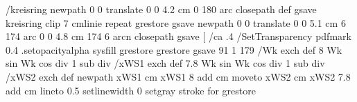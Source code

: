 {{%
/kreisring { newpath
                      0 0 translate
                      0 0 4.2 cm 0 180 arc
                     closepath
                    } def
               gsave
                        kreisring clip
                        7 {cmlinie} repeat
              grestore
   gsave
                 newpath
                      0 0 translate
                      0 0 5.1 cm 6 174 arc
                      0 0 4.8 cm 174 6 arcn
                 closepath
                   gsave
                    \pst@usecolor\ProLineCol
                      [ /ca .4 /SetTransparency  pdfmark %
                       0.4 .setopacityalpha
                       sysfill
                 grestore
   grestore
 gsave
   91 1 179 { /Wk exch def %
                       {8 Wk sin Wk cos div 1 sub div} /xWS1 exch def %
                       {7.8 Wk sin Wk cos div 1 sub div} /xWS2 exch def %
                        newpath
                        xWS1 cm xWS1 8 add cm moveto %
                        xWS2 cm xWS2 7.8 add cm %
                       lineto
                       0.5 setlinewidth
                       0 setgray
                       stroke
                   } for
  grestore
}}
